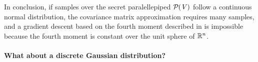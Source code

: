 In conclusion, if samples over the secret paralellepiped $\mathcal{P}_{}(\mathit{V})$ follow a continuous normal distribution, the covariance matrix approximation requires many samples, and a gradient descent based on the fourth moment described in \cite{NR09}
is impossible because the fourth moment is constant over the unit sphere of $\mathbb{R}^n$.

\paragraph{What about a discrete Gaussian distribution?}

